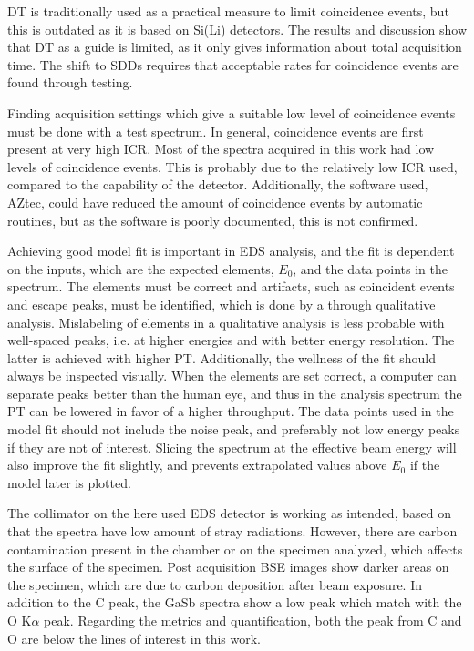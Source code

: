 DT is traditionally used as a practical measure to limit coincidence events, but this is outdated as it is based on Si(Li) detectors.
The results and discussion show that DT as a guide is limited, as it only gives information about total acquisition time.
The shift to SDDs requires that acceptable rates for coincidence events are found through testing.

Finding acquisition settings which give a suitable low level of coincidence events must be done with a test spectrum.
In general, coincidence events are first present at very high ICR.
Most of the spectra acquired in this work had low levels of coincidence events.
This is probably due to the relatively low ICR used, compared to the capability of the detector.
Additionally, the software used, AZtec, could have reduced the amount of coincidence events by automatic routines, but as the software is poorly documented, this is not confirmed.



Achieving good model fit is important in EDS analysis, and the fit is dependent on the inputs, which are the expected elements, $E_0$, and the data points in the spectrum.
The elements must be correct and artifacts, such as coincident events and escape peaks, must be identified, which is done by a through qualitative analysis.
Mislabeling of elements in a qualitative analysis is less probable with well-spaced peaks, i.e. at higher energies and with better energy resolution.
The latter is achieved with higher PT.
Additionally, the wellness of the fit should always be inspected visually.
When the elements are set correct, a computer can separate peaks better than the human eye, and thus in the analysis spectrum the PT can be lowered in favor of a higher throughput.
The data points used in the model fit should not include the noise peak, and preferably not low energy peaks if they are not of interest.
Slicing the spectrum at the effective beam energy will also improve the fit slightly, and prevents extrapolated values above $E_0$ if the model later is plotted.



The collimator on the here used EDS detector is working as intended, based on that the spectra have low amount of stray radiations.
However, there are carbon contamination present in the chamber or on the specimen analyzed, which affects the surface of the specimen.
Post acquisition BSE images show darker areas on the specimen, which are due to carbon deposition after beam exposure.
In addition to the C peak, the GaSb spectra show a low peak which match with the O K$\alpha$ peak.
Regarding the metrics and quantification, both the peak from C and O are below the lines of interest in this work.

